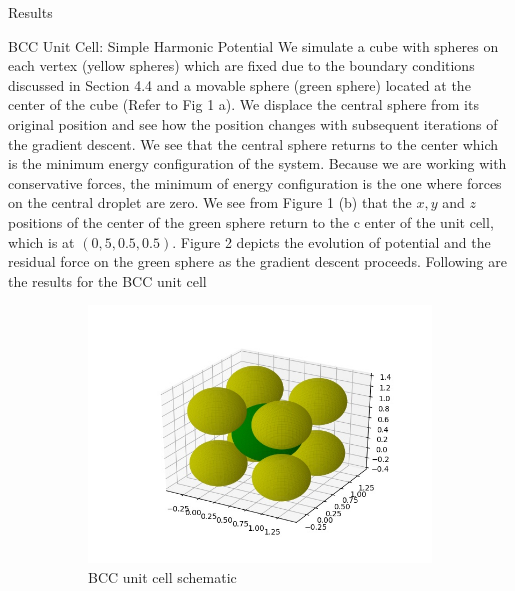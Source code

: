 \documentclass[12pt]{article}
\begin{document}
\newpage
\begin{section}{Results}

\begin{subsection}{BCC Unit Cell: Simple Harmonic Potential}
We simulate a cube with spheres on each vertex (yellow spheres) which are fixed due to the boundary conditions discussed in Section 4.4 and a movable sphere (green sphere) located at the center of the cube (Refer to Fig 1 a). We displace the central sphere from its original position and see how the position changes with subsequent iterations of the gradient descent. We see that the central sphere returns to the center which is the minimum energy configuration of the system. Because we are working with conservative forces, the minimum of energy configuration is the one where forces on the central droplet are zero. We see from Figure 1 (b) that the $x, y$ and $z$ positions of the center of the green sphere return to the c
enter of the unit cell, which is at $(0,5,0.5,0.5)$. Figure 2 depicts the evolution of potential and the residual force on the green sphere as the gradient descent proceeds. 
Following are the results for the BCC unit cell
\begin{figure}[h!]
    \begin{subfigure}{0.5\textwidth}
        \includegraphics[width=\linewidth]{images/picturebcc.jpg}
        \caption{BCC unit cell schematic}
        \label{fig:sub1}
    \end{subfigure}
    \begin{subfigure}{0.5\textwidth}

\end{subfigure}
\end{figure}
\end{subsection}
\end{section}
\end{document}
